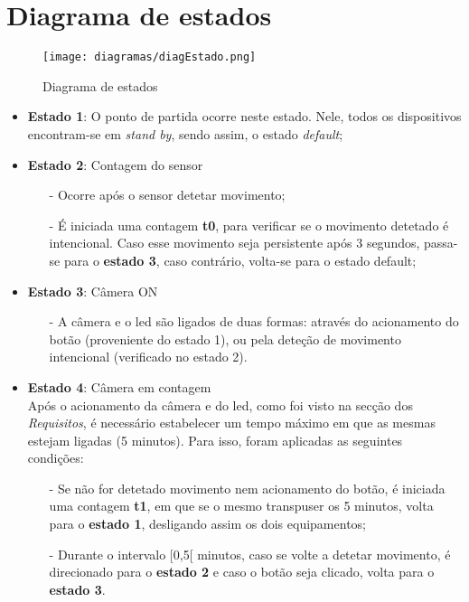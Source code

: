 \documentclass{article}
\begin{document}
\newpage
\section{Diagrama de estados}

    \begin{figure}[h!]
    \centering
    \texttt{[image: diagramas/diagEstado.png]}
    \caption{Diagrama de estados}
    \label{fig:diagEstados}
\end{figure}

\begin{itemize}
     \item \textbf{Estado 1}: O ponto de partida ocorre neste estado. Nele, todos os dispositivos encontram-se em \textit{stand by}, sendo assim, o estado \textit{default};
    
    \item \textbf{Estado 2}: Contagem do sensor
        \begin{itemize}
            \item[-] Ocorre após o sensor detetar movimento;
            \item[-] É iniciada uma contagem \textbf{t0}, para verificar se o movimento detetado é intencional. Caso esse movimento seja persistente após 3 segundos, passa-se para o \textbf{estado 3}, caso contrário, volta-se para o estado default;
        \end{itemize}
        
    \item \textbf{Estado 3}: Câmera ON
        \begin{itemize}
            \item[-] A câmera e o led são ligados de duas formas: através do acionamento do botão (proveniente do estado 1), ou pela deteção de movimento intencional (verificado no estado 2).
        \end{itemize}
        
    \item \textbf{Estado 4}: Câmera em contagem \\
    
        \hspace{0.5cm}Após o acionamento da câmera e do led, como foi visto na secção dos \textit{Requisitos},  é necessário estabelecer um tempo máximo em que as mesmas estejam ligadas (5 minutos). Para isso, foram aplicadas as seguintes condições:
        
        \begin{itemize}
            \item[-] Se não for detetado movimento nem acionamento do botão, é iniciada uma contagem \textbf{t1}, em que se o mesmo transpuser os 5 minutos, volta para o \textbf{estado 1}, desligando assim os dois equipamentos;
            \item[-] Durante o intervalo [0,5[ minutos, caso se volte a detetar movimento, é direcionado para o \textbf{estado 2} e caso o botão seja clicado, volta para o \textbf{estado 3}.
        \end{itemize}
    
    
\end{itemize}
\end{document}
